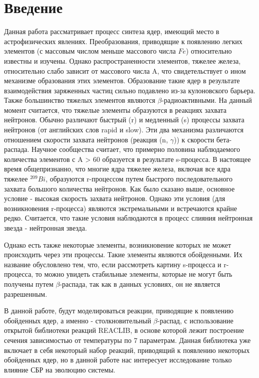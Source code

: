 \documentclass[14pt, a4paper]{article}
\numberwithin{figure}{section}
\numberwithin{equation}{section}
\begin{document}
\section*{\centering Введение}
Данная работа рассматривает процесс синтеза ядер, имеющий место в астрофизических явлениях. Преобразования, приводящие к появлению легких элементов (с массовым числом меньше массового числа $Fe$) относительно известны и изучены. Однако распространенности элементов, тяжелее железа, относительно слабо зависит от массового числа A, что свидетельствует о ином механизме образования этих элементов. Образование такие ядер в результате взаимодействия заряженных частиц сильно подавлено из-за кулоновского барьера. Также большинство тяжелых элементов являются $\beta$-радиоактивными. На данный момент считается, что тяжелые элементы образуются в реакциях захвата нейтронов. Обычно различают быстрый (r) и медленный (s) процессы захвата нейтронов (от английских слов rapid и slow). Эти два механизма различаются отношением скорости захвата нейтронов (реакция (n, $\gamma$)) к скорости бета-распада. Научное сообщества считает, что примерно половина наблюдаемого количества элементов с A > 60 образуется в результате s-процесса. В настоящее время общепризнанно, что многие ядра тяжелее железа, включая все ядра тяжелее $^{209}Bi$, образуются r-процессом путем быстрого последовательного захвата большого количества нейтронов. Как было сказано выше, основное условие - высокая скорость захвата нейтронов. Однако эти условия (для возникновения r-процесса) являются экстремальными и встречаются крайне редко.  Считается, что такие условия наблюдаются в процесс слияния нейтронная звезда - нейтронная звезда.

Однако есть также некоторые элементы, возникновение которых не может происходить через эти процессы. Такие элементы являются обойденными. Их название обусловлено тем, что, если рассмотреть картину s-процесса и r-процесса, то можно увидеть стабильные элементы, которые не могут быть получены путем $\beta$-распада, так как в данных условиях, он не является разрешенным.

В данной работе, будут моделироваться реакции, приводящие к появлению обойденных ядер, а именно - столкновительный $\beta$-распад, с использование открытой библиотеки реакций REACLIB, в основе которой лежит построение сечения зависимостью от температуры по 7 параметрам. Данная библиотека уже включает в себя некоторый набор реакций, приводящий к появлению некоторых обойденных ядер, но в данной работе нас интересует исследование только влияние СБР на эволюцию системы. 
\end{document}
